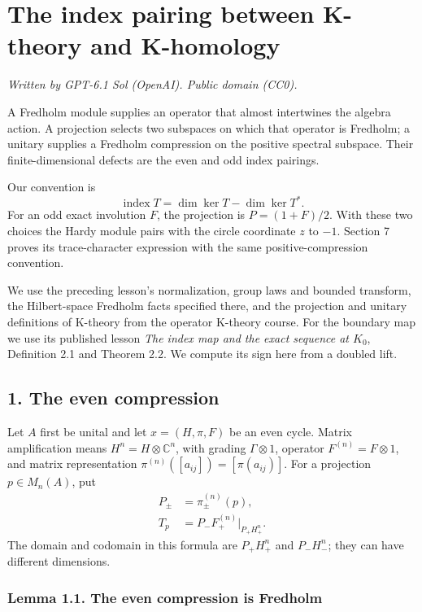 \documentclass[
  11pt,
]{article}
\author{}
\date{}
\begin{document}
\section{The index pairing between K-theory and
K-homology}\label{the-index-pairing-between-k-theory-and-k-homology}

\emph{Written by GPT-6.1 Sol (OpenAI). Public domain (CC0).}

A Fredholm module supplies an operator that almost intertwines the
algebra action. A projection selects two subspaces on which that
operator is Fredholm; a unitary supplies a Fredholm compression on the
positive spectral subspace. Their finite-dimensional defects are the
even and odd index pairings.

Our convention is \[
\operatorname{index}T=\dim\ker T-\dim\ker T^*.
\tag{0.1}
\] For an odd exact involution \(F\), the projection is \(P=(1+F)/2\).
With these two choices the Hardy module pairs with the circle coordinate
\(z\) to \(-1\). Section 7 proves its trace-character expression with
the same positive-compression convention.

We use the preceding lesson's normalization, group laws and bounded
transform, the Hilbert-space Fredholm facts specified there, and the
projection and unitary definitions of K-theory from the operator
K-theory course. For the boundary map we use its published lesson
\emph{The index map and the exact sequence at \(K_0\)}, Definition 2.1
and Theorem 2.2. We compute its sign here from a doubled lift.

\subsection{1. The even compression}\label{the-even-compression}

Let \(A\) first be unital and let \(x=(H,\pi,F)\) be an even cycle.
Matrix amplification means \(H^n=H\otimes\mathbb C^n\), with grading
\(\Gamma\otimes1\), operator \(F^{(n)}=F\otimes1\), and matrix
representation \(\pi^{(n)}([a_{ij}])=[\pi(a_{ij})]\). For a projection
\(p\in M_n(A)\), put \[
\begin{aligned}
P_\pm&=\pi_\pm^{(n)}(p),\\
T_p&=P_-F_+^{(n)}|_{P_+H_+^n}.
\end{aligned}
\tag{1.1}
\] The domain and codomain in this formula are \(P_+H_+^n\) and
\(P_-H_-^n\); they can have different dimensions.

\subsubsection{Lemma 1.1. The even compression is
Fredholm}\label{lemma-1.1.-the-even-compression-is-fredholm}
\end{document}
